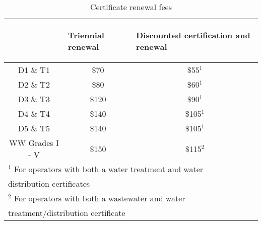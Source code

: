 \newpage
\begin{table}[ht!]
\captionsetup{justification=centering}
\scriptsize
\begin{center}
\begin{tabular}{|c|p{2cm}|p{2cm}|}
\hline
 & \begin{center}{Triennial renewal}\end{center} & \begin{center}{Discounted certification and renewal}\end{center}\\
\hline
D1 \& T1 & \multicolumn{1}{|c|}{\$70} & \multicolumn{1}{|c|}{\$55$^1$}\\
\hline
D2 \& T2  & \multicolumn{1}{|c|}{\$80} & \multicolumn{1}{|c|}{\$60$^1$}\\
\hline
D3 \& T3 & \multicolumn{1}{|c|}{\$120} & \multicolumn{1}{|c|}{\$90$^1$}\\
\hline
D4 \& T4 & \multicolumn{1}{|c|}{\$140}& \multicolumn{1}{|c|}{\$105$^1$}\\
\hline
D5 \& T5 &  \multicolumn{1}{|c|}{\$140}& \multicolumn{1}{|c|}{\$105$^1$}\\
\hline
WW Grades I - V & \multicolumn{1}{|c|}{\$150}& \multicolumn{1}{|c|}{\$115$^2$}\\
\hline
\multicolumn{3}{|l|}{$^1$ For operators with both a water treatment and water }\\ \multicolumn{3}{|l|}{ \hspace{0.27cm}distribution certificates}\\
\multicolumn{3}{|l|}{$^2$ For operators with both a wastewater and water}\\ \multicolumn{3}{|l|}{   \hspace{0.27cm}treatment/distribution certificate}\\
\hline

\end{tabular}
\caption{Certificate renewal fees}
\end{center}
\end{table}






